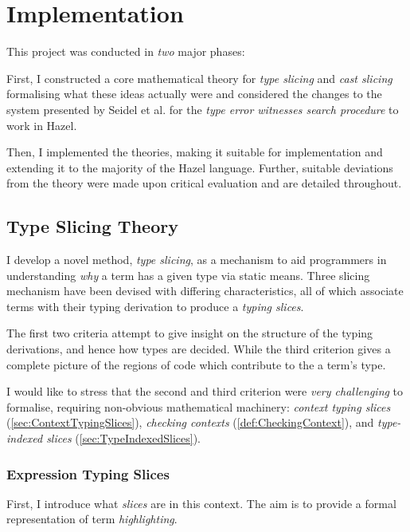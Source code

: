 \chapter{Implementation}\label{chap:Implementation}
This project was conducted in \textit{two} major phases:

First, I constructed a core mathematical theory for \textit{type slicing} and \textit{cast slicing} formalising what these ideas actually were and considered the changes to the system presented by Seidel et al. for the \textit{type error witnesses search procedure} to work in Hazel.  

Then, I implemented the theories, making it suitable for implementation and extending it to the majority of the Hazel language. Further, suitable deviations from the theory were made upon critical evaluation and are detailed throughout.

\section{Type Slicing Theory}\label{sec:TypeSlicingTheory}

I develop a novel method, \textit{type slicing}, as a mechanism to aid programmers in understanding \textit{why} a term has a given type via static means. Three slicing mechanism have been devised with differing characteristics, all of which associate terms with their typing derivation to produce a \textit{typing slices}. 

The first two criteria attempt to give insight on the structure of the typing derivations, and hence how types are decided. While the third criterion gives a complete picture of the regions of code which contribute to the a term's type.

I would like to stress that the second and third criterion were \textit{very challenging} to formalise, requiring non-obvious mathematical machinery: \textit{context typing slices} (\cref{sec:ContextTypingSlices}), \textit{checking contexts} (\cref{def:CheckingContext}), and \textit{type-indexed slices} (\cref{sec:TypeIndexedSlices}).

\subsection{Expression Typing Slices}\label{sec:ExpressionTypingSlices}
First, I introduce what \textit{slices} are in this context. The aim is to provide a formal representation of term \textit{highlighting}. 

